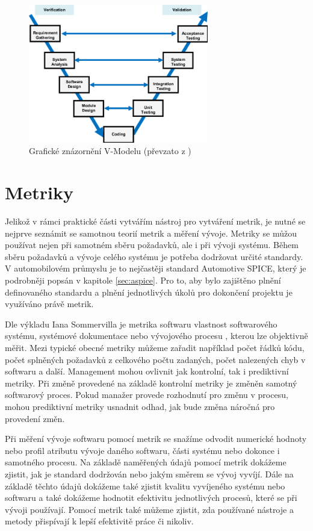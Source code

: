 \documentclass[czech,master]{diploma}
\begin{document}
 \begin{figure}[!ht]
    \centering
    \includegraphics[width=0.7\textwidth]{Diplomka/Figures/v-model-in-software-testing.png}
    \caption{Grafické znázornění V-Modelu (převzato z \cite{ref:vmodel_Tierno2016})}
    \label{fig:v_model}
\end{figure}


\chapter{Metriky}
\label{sec:metrics}
Jelikož v rámci praktické části vytvářím nástroj pro vytváření metrik, je nutné se nejprve seznámit se samotnou teorií metrik a měření vývoje. Metriky se můžou používat nejen při samotném sběru požadavků, ale i při vývoji systému. Během sběru požadavků a vývoje celého systému je potřeba dodržovat určité standardy. V automobilovém průmyslu je to nejčastěji standard Automotive SPICE, který je podrobněji popsán v kapitole \ref{sec:aspice}. Pro to, aby bylo zajištěno plnění definovaného standardu a plnění jednotlivých úkolů pro dokončení projektu je využíváno právě metrik.

Dle výkladu Iana Sommervilla \cite{ref:metric_definition} je metrika softwaru vlastnost softwarového systému, systémové dokumentace nebo vývojového procesu , kterou lze objektivně měřit. Mezi typické obecné metriky můžeme zařadit například počet řádků kódu, počet splněných požadavků z celkového počtu zadaných, počet nalezených chyb v softwaru a další. Management mohou ovlivnit jak kontrolní, tak i prediktivní metriky. Při změně provedené na základě kontrolní metriky je změněn samotný softwarový proces. Pokud manažer provede rozhodnutí pro změnu v procesu, mohou prediktivní metriky usnadnit odhad, jak bude změna náročná pro provedení změn.

Při měření vývoje softwaru pomocí metrik se snažíme odvodit numerické hodnoty nebo profil atributu vývoje daného softwaru, části systému nebo dokonce i samotného procesu. Na základě naměřených údajů pomocí metrik dokážeme zjistit, jak je standard dodržován nebo jakým směrem se vývoj vyvíjí. Dále na základě těchto údajů dokážeme také zjistit kvalitu vyvíjeného systému nebo softwaru a také dokážeme hodnotit efektivitu jednotlivých procesů, které se při vývoji používají. Pomocí metrik také můžeme zjistit, zda používané nástroje a metody přispívají k lepší efektivitě práce či nikoliv.
\end{document}
